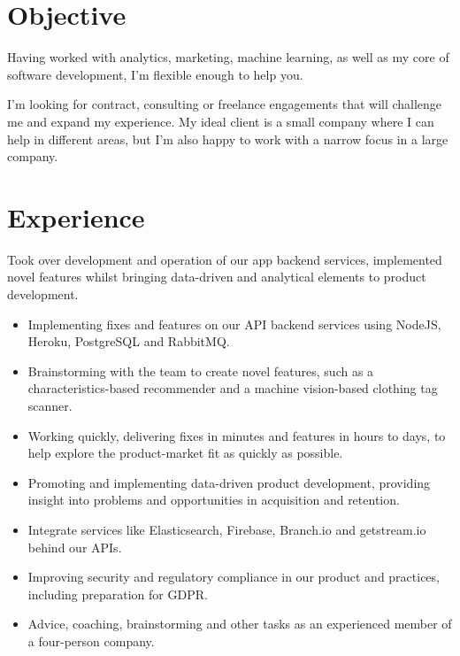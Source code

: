 \documentclass[11pt,a4paper,sans]{moderncv}        %
\begin{document}
\makecvtitle

\section{Objective}
Having worked with analytics, marketing, machine learning, as well as my core of software development, I'm flexible enough to help you.

I'm looking for contract, consulting or freelance engagements that will challenge me and expand my experience.
My ideal client is a small company where I can help in different areas, but I'm also happy to work with a narrow focus in a large company.

\section{Experience}
{Took over development and operation of our app backend services, implemented novel features whilst bringing data-driven and analytical elements to product development.
\newline{}
\begin{itemize}
\item Implementing fixes and features on our API backend services using NodeJS, Heroku, PostgreSQL and RabbitMQ.
\item Brainstorming with the team to create novel features, such as a characteristics-based recommender and a machine vision-based clothing tag scanner.
\item Working quickly, delivering fixes in minutes and features in hours to days, to help explore the product-market fit as quickly as possible.
\item Promoting and implementing data-driven product development, providing insight into problems and opportunities in acquisition and retention.
\item Integrate services like Elasticsearch, Firebase, Branch.io and getstream.io behind our APIs.
\item Improving security and regulatory compliance in our product and practices, including preparation for GDPR.
\item Advice, coaching, brainstorming and other tasks as an experienced member of a four-person company.
\end{itemize}
}
\end{document}
